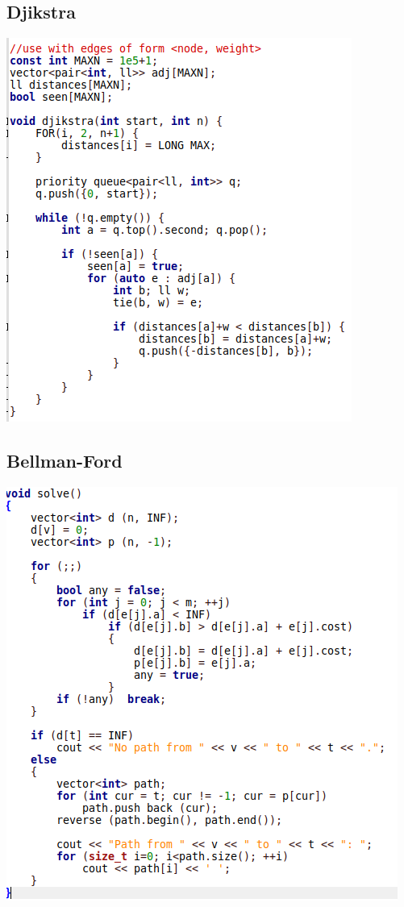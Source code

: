 \documentclass[11pt,twocolumn]{article}
\begin{document}
\subsection{Djikstra}
\includegraphics[scale=0.5]{djikstra}
\subsection{Bellman-Ford}

\includegraphics[scale=0.5]{bellmanford}
\end{document}
